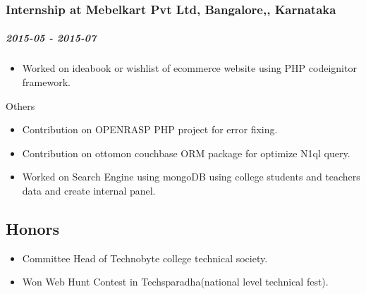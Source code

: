\subsubsection{Internship at Mebelkart Pvt Ltd, Bangalore,, Karnataka}

\subparagraph{2015-05 - 2015-07}

\begin{itemize}
\itemsep1pt\parskip0pt
\item
  Worked on ideabook or wishlist of ecommerce website using PHP
  codeignitor framework.
\end{itemize}

Others

\begin{itemize}
\itemsep1pt\parskip0pt
\item
  Contribution on OPENRASP PHP project for error fixing.
\item
  Contribution on ottomon couchbase ORM package for optimize N1ql query.
\item
  Worked on Search Engine using mongoDB using college students and
  teachers data and create internal panel.
\end{itemize}

\subsection{Honors}

\begin{itemize}
\itemsep1pt\parskip0pt
\item
  Committee Head of Technobyte college technical society.
\item
  Won Web Hunt Contest in Techsparadha(national level technical fest).
\end{itemize}